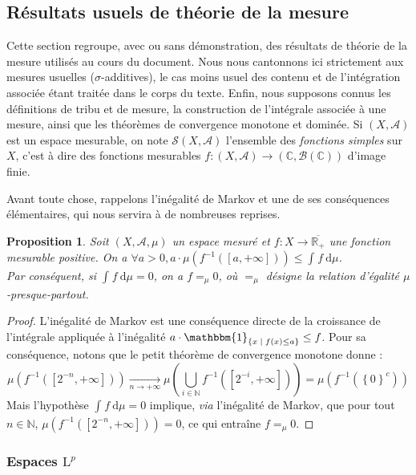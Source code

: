 \documentclass[a4paper,12pt]{article}
\newtheorem{proposition}[theorem]{Proposition}
\newcommand{\R}{\mathbb{R}}
\newcommand{\N}{\mathbb{N}}
\newcommand{\C}{\mathbb{C}}
\newcommand{\Bor}{\mathcal{B}}
\newcommand{\set}[1]{\left\{ #1 \right\}}
\newcommand{\indic}{\mathbbm{1}}
\newcommand{\integral}[4]{\int_{#1}^{#2} #3~\mathrm{d}#4}
\newcommand{\tq}{\;\middle|\;}
\newcommand{\inv}{^{-1}}
\newcommand{\compl}{^c}
\begin{document}
\subsection*{Résultats usuels de théorie de la mesure}

Cette section regroupe, avec ou sans démonstration, des résultats de théorie de la mesure utilisés au cours du document.
Nous nous cantonnons ici strictement aux mesures usuelles ($\sigma$-additives), le cas moins usuel des contenu et de 
l'intégration associée étant traitée dans le corps du texte. Enfin, nous supposons connus les définitions de tribu et de mesure,
la construction de l'intégrale associée à une mesure, ainsi que les théorèmes de convergence monotone et dominée.
Si $(X, \mathcal{A})$ est un espace mesurable, on note $\mathscr{S}(X, \mathcal{A})$ l'ensemble des \emph{fonctions simples}
sur $X$, c'est à dire des fonctions mesurables $f : (X, \mathcal{A})\to(\C, \Bor(\C))$ d'image finie. 

Avant toute chose, rappelons l'inégalité de Markov et une de ses conséquences élémentaires, qui nous servira à de nombreuses reprises.
\begin{proposition}\label{markov_and_consequence}
    Soit $(X, \mathcal{A}, \mu)$ un espace mesuré et $f:X\to\overline{\R_+}$ une fonction mesurable positive.
    On a $\forall a>0, a\cdot\mu\left(f\inv([a, +\infty])\right) \le \integral{}{}{f}{\mu}$. \\
    Par conséquent, si $\integral{}{}{f}{\mu} = 0$, on a $f =_\mu 0$, où $=_\mu$ désigne la relation 
    d'égalité $\mu$-presque-partout.
\end{proposition}

\begin{proof}
    L'inégalité de Markov est une conséquence directe de la croissance de l'intégrale appliquée à 
    l'inégalité $a\cdot\indic_{\set{x\tq f(x)\le a}} \le f$. Pour sa conséquence, notons que le petit théorème de convergence monotone donne :
    \begin{equation*}
        \mu(f\inv([2^{-n}, +\infty])) \xrightarrow[n\to+\infty]{} \mu\left(\bigcup_{i\in\N} f\inv([2^{-i}, +\infty])\right) = \mu(f\inv(\set{0}\compl))
    \end{equation*}
    Mais l'hypothèse $\integral{}{}{f}{\mu} = 0$ implique, \emph{via} l'inégalité de Markov, que pour tout $n\in\N$, $\mu(f\inv([2^{-n}, +\infty]))=0$,
    ce qui entraîne $f =_\mu 0$.
\end{proof}

\subsubsection*{Espaces \texorpdfstring{$\mathrm{L}^p$}{L\textsuperscript{p}}}
\end{document}
